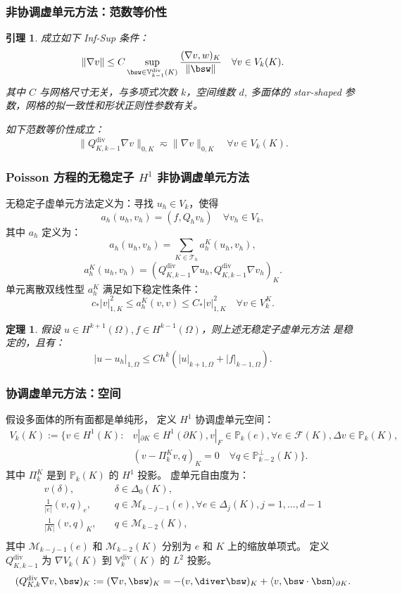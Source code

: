 \documentclass[notheorems,serif]{beamer}
\newcommand{\hei}[1]{{\HEI#1}}
\newtheorem{theorem}{\hei{定理}}
\newtheorem{lemma}{\hei{引理}}
\begin{document}
\begin{frame}
    \frametitle{非协调虚单元方法：范数等价性}
    \begin{lemma}
        成立如下 Inf-Sup 条件：
        $$
        \|\nabla v\| \leq C \sup_{\bsw \in
        \mathbb{V}^{\mathrm{div}}_{k-1}(K)}\frac{(\nabla v,
        w)_K}{\|\bsw\|} \quad \forall v \in V_k(K).
        $$
        其中 $C$ 与网格尺寸无关，与多项式次数 $k$，空间维数 $d$, 多面体的
        star-shaped 参数，网格的拟一致性和形状正则性参数有关。
        
        如下范数等价性成立：
        $$
        \|Q_{K, k-1}^{\mathrm{div}}\nabla v\|_{0, K} \eqsim \|\nabla v\|_{0, K} 
        \quad \forall v \in V_k(K).
        $$
    \end{lemma}
\end{frame}

\begin{frame}
    \frametitle{Poisson 方程的无稳定子 $H^1$ 非协调虚单元方法}
无稳定子虚单元方法定义为：寻找 $u_h \in V_k$，使得
$$
a_h(u_h, v_h) = (f, Q_h v_h) \quad \forall v_h \in V_k,
$$
其中 $a_h$ 定义为：
$$
a_h(u_h, v_h) = \sum_{K \in \mathcal{T}_h} a_h^K(u_h, v_h),
$$
$$
a_h^K(u_h, v_h) = (Q_{K, k-1}^{\mathrm{div}}\nabla u_h, Q_{K,
k-1}^{\mathrm{div}}\nabla v_h)_K.
$$
单元离散双线性型 $a_h^K$ 满足如下稳定性条件：
$$
c_* |v|_{1, K}^2 \leq a_h^K(v, v) \leq C_* |v|_{1, K}^2 \quad \forall v \in
V_k^K.
$$
\begin{theorem}
假设 $u \in H^{k+1}(\Omega), f \in H^{k-1}(\Omega)$，则上述无稳定子虚单元方法
是稳定的，且有：
$$
|u - u_h|_{1, \Omega} \leq C h^{k}
(|u|_{k+1, \Omega} + |f|_{k-1, \Omega}).
$$
\end{theorem}
\end{frame}

\begin{frame}
\frametitle{协调虚单元方法：空间}
假设多面体的所有面都是单纯形，
定义 $H^1$ 协调虚单元空间：
$$
\begin{aligned}
    V_k(K) := \{v \in H^1(K): & v|_{\partial K} \in H^1(\partial K), v|_F \in 
        \mathbb{P}_k(e), \forall e \in \mathcal{F}(K),
    \Delta v \in \mathbb{P}_{k}(K),\\
    & (v-\Pi_k^K v, q)_K = 0 \quad \forall q \in
    \mathbb{P}_{k-2}^{\perp}(K)\}.
\end{aligned}
$$
其中 $\Pi_k^K$ 是到 $\mathbb{P}_k(K)$ 的 $H^1$ 投影。
虚单元自由度为：
$$
\begin{aligned} 
    v(\delta), & \quad \delta \in \mathcal{\Delta}_0(K), \\
    \frac{1}{|e|}(v, q)_{e}, & \quad q \in \mathcal{M}_{k-j-1}(e), \forall e \in
    \Delta_j(K), j = 1, \dots, d-1\\
    \frac{1}{|K|}(v, q)_{K}, & \quad q\in \mathcal{M}_{k-2}(K), \\
\end{aligned}
$$
其中 $\mathcal{M}_{k-j-1}(e)$ 和 $\mathcal{M}_{k-2}(K)$ 分别为 $e$ 和 $K$
上的缩放单项式。
定义 $Q_{K, k-1}^{\mathrm{div}}$ 为 $\nabla V_k(K)$ 到
$\mathbb{V}^{\mathrm{div}}_{k}(K)$ 的 $L^2$ 投影。
$$
(Q_{K, k}^{\mathrm{div}}\nabla v, \bsw)_K := (\nabla v,
\bsw)_K = -(v, \diver \bsw)_K + \langle v, \bsw 
\cdot \bsn\rangle_{\partial K}.
$$
\end{frame}
\end{document}
